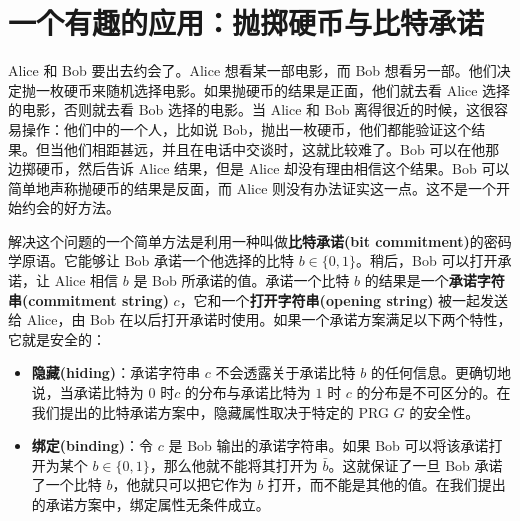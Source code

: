 \section{一个有趣的应用：抛掷硬币与比特承诺}\label{sec:3-12}

Alice 和 Bob 要出去约会了。Alice 想看某一部电影，而 Bob 想看另一部。他们决定抛一枚硬币来随机选择电影。如果抛硬币的结果是正面，他们就去看 Alice 选择的电影，否则就去看 Bob 选择的电影。当 Alice 和 Bob 离得很近的时候，这很容易操作：他们中的一个人，比如说 Bob，抛出一枚硬币，他们都能验证这个结果。但当他们相距甚远，并且在电话中交谈时，这就比较难了。Bob 可以在他那边掷硬币，然后告诉 Alice 结果，但是 Alice 却没有理由相信这个结果。Bob 可以简单地声称抛硬币的结果是反面，而 Alice 则没有办法证实这一点。这不是一个开始约会的好方法。

解决这个问题的一个简单方法是利用一种叫做\textbf{比特承诺(bit commitment)}的密码学原语。它能够让 Bob 承诺一个他选择的比特 $b\in\{0,1\}$。稍后，Bob 可以打开承诺，让 Alice 相信 $b$ 是 Bob 所承诺的值。承诺一个比特 $b$ 的结果是一个\textbf{承诺字符串(commitment string)} $c$，它和一个\textbf{打开字符串(opening string)} 被一起发送给 Alice，由 Bob 在以后打开承诺时使用。如果一个承诺方案满足以下两个特性，它就是安全的：
\begin{itemize}
	\item \textbf{隐藏(hiding)}：承诺字符串 $c$ 不会透露关于承诺比特 $b$ 的任何信息。更确切地说，当承诺比特为 $0$ 时$c$ 的分布与承诺比特为 $1$ 时 $c$ 的分布是不可区分的。在我们提出的比特承诺方案中，隐藏属性取决于特定的 PRG $G$ 的安全性。
	\item \textbf{绑定(binding)}：令 $c$ 是 Bob 输出的承诺字符串。如果 Bob 可以将该承诺打开为某个 $b\in\{0,1\}$，那么他就不能将其打开为 $\bar{b}$。这就保证了一旦 Bob 承诺了一个比特 $b$，他就只可以把它作为 $b$ 打开，而不能是其他的值。在我们提出的承诺方案中，绑定属性无条件成立。
\end{itemize}


